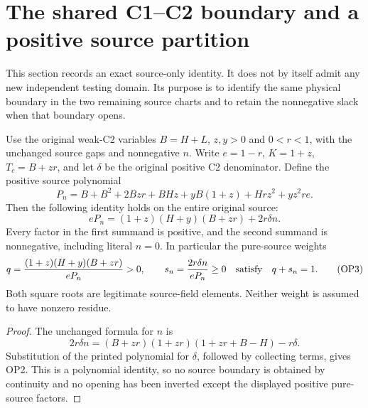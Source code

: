 \section{The shared C1--C2 boundary and a positive source partition}
\label{sec:r13-source-overlap}

This section records an exact source-only identity. It does not by itself
admit any new independent testing domain. Its purpose is to identify the
same physical boundary in the two remaining source charts and to retain
the nonnegative slack when that boundary opens.

Use the original weak-C2 variables $B=H+L$, $z,y>0$ and $0<r<1$,
with the unchanged source gaps and nonnegative $n$. Write $e=1-r$,
$K=1+z$, $T_c=B+zr$, and let $\delta$ be the original positive
C2 denominator. Define the positive source polynomial
\[
 P_n=B+B^2+2Bzr+BHz+yB(1+z)+Hrz^2+yz^2re.
 \tag{OP1}
\]
Then the following identity holds on the entire original source:
\[
 \boxed{\quad eP_n=(1+z)(H+y)(B+zr)+2r\delta n.\quad}
 \tag{OP2}
\]
Every factor in the first summand is positive, and the second summand
is nonnegative, including literal $n=0$. In particular the pure-source
weights
\[
 q={ (1+z)(H+y)(B+zr)\over eP_n}>0,
 \qquad s_n={2r\delta n\over eP_n}\ge0
 \quad\hbox{satisfy}\quad q+s_n=1.                   \tag{OP3}
\]
Both square roots are legitimate source-field elements. Neither weight
is assumed to have nonzero residue.

\begin{proof}
The unchanged formula for $n$ is
\[
 2r\delta n=(B+zr)(1+zr)(1+zr+B-H)-r\delta.
\]
Substitution of the printed polynomial for $\delta$, followed by
collecting terms, gives OP2. This is a polynomial identity, so no
source boundary is obtained by continuity and no opening has been
inverted except the displayed positive pure-source factors.
\end{proof}

